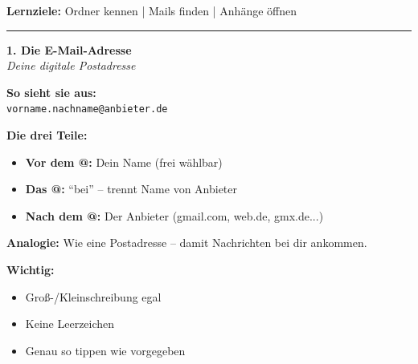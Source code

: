 \documentclass[a4paper,landscape,8pt]{extarticle}
\begin{document}

 \hfill
{\footnotesize\textbf{Lernziele:} Ordner kennen | Mails finden | Anhänge öffnen}

\vspace{1mm}
\hrule
\vspace{1mm}

\begin{minipage}[t]{0.32\linewidth}
\begin{center}
\colorbox{mailblue!10}{%
\begin{minipage}{0.95\linewidth}
\vspace{2mm}
\begin{center}
{\Large\bfseries\textcolor{mailblue}{1. Die E-Mail-Adresse}}\\[1pt]
{\footnotesize\itshape Deine digitale Postadresse}
\end{center}
\vspace{2mm}
\end{minipage}%
}
\end{center}

\vspace{1mm}

\textbf{So sieht sie aus:}\\
\texttt{vorname.nachname@anbieter.de}

\textbf{Die drei Teile:}
\begin{itemize}
\item \textbf{Vor dem @:} Dein Name (frei wählbar)
\item \textbf{Das @:} ``bei'' -- trennt Name von Anbieter
\item \textbf{Nach dem @:} Der Anbieter (gmail.com, web.de, gmx.de...)
\end{itemize}

\textbf{Analogie:} Wie eine Postadresse -- damit Nachrichten bei dir ankommen.

\textbf{Wichtig:}
\begin{itemize}
\item Groß-/Kleinschreibung egal
\item Keine Leerzeichen
\item Genau so tippen wie vorgegeben
\end{itemize}

\end{minipage}%
\end{document}
